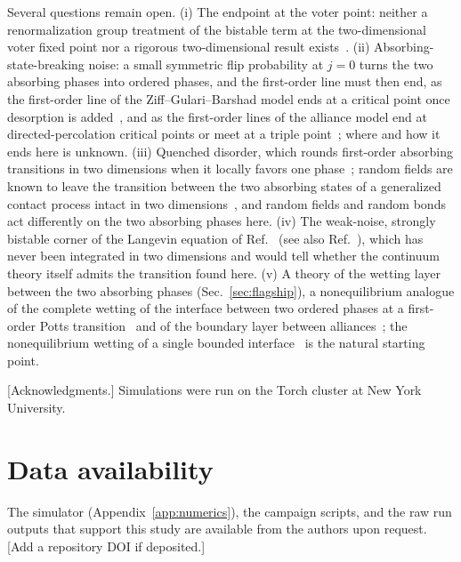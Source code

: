 \documentclass[pre,twocolumn,superscriptaddress,showpacs,floatfix]{revtex4-2}
\newcommand{\pending}[1]{{\color{red}[#1]}}
\begin{document}
Several questions remain open. (i) The endpoint at the voter point: neither a renormalization
group treatment of the bistable term at the two-dimensional voter fixed point nor a rigorous
two-dimensional result exists~\cite{canet2005,cox2025}. (ii) Absorbing-state-breaking noise: a
small symmetric flip probability at $j = 0$ turns the two absorbing phases into ordered phases,
and the first-order line must then end, as the first-order line of the Ziff--Gulari--Barshad
model ends at a critical point once desorption is added~\cite{ziff1986,tome1993}, and as the
first-order lines of the alliance model end at directed-percolation critical points or meet at a
triple point~\cite{guisoni2013}; where and how it ends here is unknown. (iii) Quenched disorder,
which rounds first-order absorbing transitions in two dimensions when it locally favors one
phase~\cite{villamartin2014}; random fields are known to leave the transition between the two
absorbing states of a generalized contact process intact in two dimensions~\cite{barghathi2016},
and random fields and random bonds act differently on the two absorbing phases here. (iv) The
weak-noise, strongly bistable corner of the Langevin equation of Ref.~\cite{alhammal2005} (see
also Ref.~\cite{russell2011}), which has never been integrated in two dimensions and would tell
whether the continuum theory itself admits the transition found here. (v) A theory of the
wetting layer between the two absorbing phases (Sec.~\ref{sec:flagship}), a nonequilibrium
analogue of the complete wetting of the interface between two ordered phases at a first-order
Potts transition~\cite{selke1983,carlon1999} and of the boundary layer between
alliances~\cite{szabo2007}; the nonequilibrium wetting of a single bounded
interface~\cite{hinrichsen1997wet,delossantos2003} is the natural starting point.

\begin{acknowledgments}
\pending{Acknowledgments.} Simulations were run on the Torch cluster at New York University.
\end{acknowledgments}

\section*{Data availability}
The simulator (Appendix~\ref{app:numerics}), the campaign scripts, and the raw run outputs that
support this study are available from the authors upon request. \pending{Add a repository DOI if
deposited.}

\appendix
\end{document}
